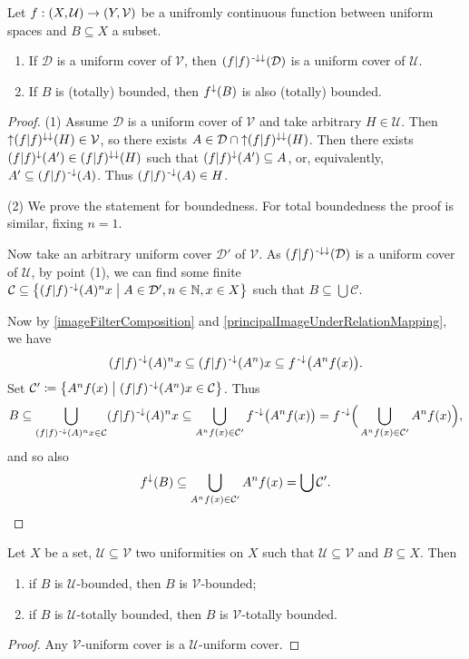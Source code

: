 \begin{proposition} \label{imageBoundedSet}
Let $f: \left( X,\mathcal{U} \right)\to \left( Y, \mathcal{V} \right)$ be a unifromly continuous function between uniform spaces and $B\subseteq X$ a subset.
\begin{enumerate}
\item If $\mathcal{D}$ is a uniform cover of $\mathcal{V}$, then $(f|f)^{{\text{\hspace{0.15em}-}\downarrow}\downarrow}(\mathcal{D})$ is a uniform cover of $\mathcal{U}$.
\item If $B$ is (totally) bounded, then $f^\downarrow(B)$ is also (totally) bounded.
\end{enumerate}
\end{proposition}
\begin{proof}
(1) Assume $\mathcal{D}$ is a uniform cover of $\mathcal{V}$ and take arbitrary $H\in \mathcal{U}$. Then $\operatorname{\uparrow} (f|f)^{\downarrow\downarrow}(H)\in \mathcal{V}$, so there exists $A\in \mathcal{D} \cap \operatorname{\uparrow} (f|f)^{\downarrow\downarrow}(H)$.
Then there exists $(f|f)^\downarrow(A')\in (f|f)^{\downarrow\downarrow}(H)$ such that $(f|f)^\downarrow(A') \subseteq A$, or, equivalently, $A'\subseteq (f|f)^{\text{\hspace{0.15em}-}\downarrow}(A)$. Thus $(f|f)^{\text{\hspace{0.15em}-}\downarrow}(A) \in H$.

(2) We prove the statement for boundedness. For total boundedness the proof is similar, fixing $n=1$.

Now take an arbitrary uniform cover $\mathcal{D}'$ of $\mathcal{V}$. As $(f|f)^{{\text{\hspace{0.15em}-}\downarrow}\downarrow}(\mathcal{D})$ is a uniform cover of $\mathcal{U}$, by point (1), we can find some finite $\mathcal{C} \subseteq \left\{ (f|f)^{\text{\hspace{0.15em}-}\downarrow}(A)^nx \;\middle|\; A\in \mathcal{D}', n\in\mathbb{N}, x\in X \right\}$ such that $B\subseteq \bigcup \mathcal{C}$.

Now by \ref{imageFilterComposition} and \ref{principalImageUnderRelationMapping}, we have
\[ (f|f)^{\text{\hspace{0.15em}-}\downarrow}(A)^nx \subseteq (f|f)^{\text{\hspace{0.15em}-}\downarrow}(A^n)x \subseteq f^{\text{\hspace{0.15em}-}\downarrow}\big(A^nf(x)\big). \]
Set $\mathcal{C}' \coloneqq \left\{ A^nf(x) \;\middle|\; (f|f)^{\text{\hspace{0.15em}-}\downarrow}(A^n)x \in \mathcal{C} \right\}$. Thus
\[ B \subseteq \bigcup_{(f|f)^{\text{\hspace{0.15em}-}\downarrow}(A)^nx \in \mathcal{C}}(f|f)^{\text{\hspace{0.15em}-}\downarrow}(A)^nx \subseteq \bigcup_{A^nf(x) \in \mathcal{C}'}f^{\text{\hspace{0.15em}-}\downarrow}\big(A^nf(x)\big) = f^{\text{\hspace{0.15em}-}\downarrow}\Big(\bigcup_{A^nf(x) \in \mathcal{C}'}A^nf(x)\Big), \]
and so also
\[ f^\downarrow(B) \subseteq \bigcup_{A^nf(x) \in \mathcal{C}'}A^nf(x) = \bigcup \mathcal{C}'. \]
\end{proof}

\begin{proposition} \label{boundednessUniformityInclusion}
Let $X$ be a set, $\mathcal{U} \subseteq \mathcal{V}$ two uniformities on $X$ such that $\mathcal{U} \subseteq \mathcal{V}$ and $B\subseteq X$. Then
\begin{enumerate}
\item if $B$ is $\mathcal{U}$-bounded, then $B$ is $\mathcal{V}$-bounded;
\item if $B$ is $\mathcal{U}$-totally bounded, then $B$ is $\mathcal{V}$-totally bounded.
\end{enumerate}
\end{proposition}
\begin{proof}
Any $\mathcal{V}$-uniform cover is a $\mathcal{U}$-uniform cover.
\end{proof}

